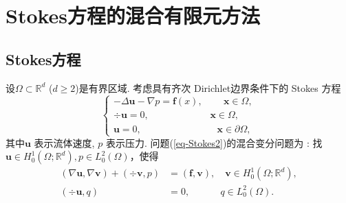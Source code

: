 \chapter{Stokes方程的混合有限元方法}

\section{Stokes方程}
设$\Omega\subset\mathbb{R}^{d}$ ($d\geq2$)是有界区域.
考虑具有齐次 Dirichlet边界条件下的  Stokes 方程
\begin{equation}\label{eq-Stokes2}
\left\{
\begin{array}{l}
-\Delta \boldsymbol{u} - \nabla p=\boldsymbol{f}(x),\qquad \,\boldsymbol{x}\in\Omega,\\
\div \boldsymbol{u}=0, \qquad \,\qquad \qquad \,\boldsymbol{x}\in\Omega,\\
\boldsymbol{u}=0,
\quad \qquad \qquad \qquad\;\;\; \boldsymbol{x}\in\partial\Omega,
\end{array}
\right.
\end{equation}
其中$\boldsymbol{u}$ 表示流体速度, $p$ 表示压力.
问题(\ref{eq-Stokes2})的混合变分问题为 : 找 $\boldsymbol{u}\in H_0^{1}(\Omega;\mathbb{R}^{d}), p\in L_{0}^{2}(\Omega)$，使得
\begin{align}
(\nabla\boldsymbol{u},\nabla\boldsymbol{v}) + (\div\boldsymbol{v},p) &=(\boldsymbol{f},\boldsymbol{v}),\quad \boldsymbol{v}\in  H_0^{1}(\Omega;\mathbb{R}^{d}),\label{BI2}\\
(\div\boldsymbol{u},q) &=0, \quad\quad\quad\, q\in L_{0}^{2}(\Omega).\label{BI02}
\end{align}

